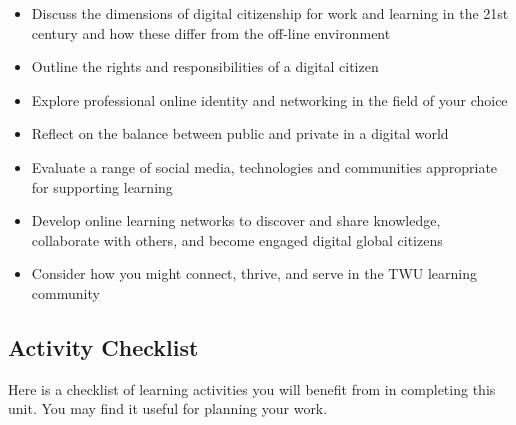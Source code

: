 \documentclass[
]{book}
\providecommand{\tightlist}{%
  \setlength{\itemsep}{0pt}\setlength{\parskip}{0pt}}
\theoremstyle{definition}
\theoremstyle{definition}
\theoremstyle{definition}
\theoremstyle{definition}
\theoremstyle{remark}
\begin{document}
\begin{itemize}
\tightlist
\item
  Discuss the dimensions of digital citizenship for work and learning in the 21st century and how these differ from the off-line environment\\
\item
  Outline the rights and responsibilities of a digital citizen\\
\item
  Explore professional online identity and networking in the field of your choice
\item
  Reflect on the balance between public and private in a digital world
\item
  Evaluate a range of social media, technologies and communities appropriate for supporting learning\\
\item
  Develop online learning networks to discover and share knowledge, collaborate with others, and become engaged digital global citizens\\
\item
  Consider how you might connect, thrive, and serve in the TWU learning community
\end{itemize}

\hypertarget{activity-checklist-4}{%
\subsection*{Activity Checklist}\label{activity-checklist-4}}

Here is a checklist of learning activities you will benefit from in completing this unit. You may find it useful for planning your work.
\end{document}
